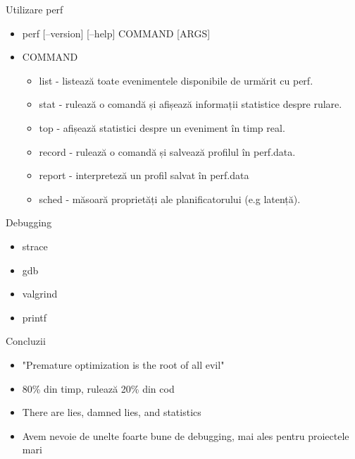 \documentclass{so.cs.pub.ro}
\begin{document}
\begin{frame}{Utilizare perf}
  \begin{itemize}
    \item perf [--version] [--help] COMMAND [ARGS]
    \item COMMAND
    \begin{itemize}
    \item list - listează toate evenimentele disponibile de urmărit cu perf. 
    \item stat - rulează o comandă și afișează informații statistice despre rulare.
    \item top - afișează statistici despre un eveniment în timp real.
    \item record - rulează o comandă și salvează profilul în perf.data.
    \item report - interpreteză un profil salvat în perf.data
    \item sched - măsoară proprietăți ale planificatorului (e.g latență).
    \end{itemize}
  \end{itemize}
\end{frame}

\begin{frame}{Debugging}
  \begin{itemize}
    \item strace
    \item gdb
    \item valgrind
    \item printf
  \end{itemize}
\end{frame}



\begin{frame}{Concluzii}
  \begin{itemize}
    \item "Premature optimization is the root of all evil"
    \item 80\% din timp, rulează 20\% din cod
    \item There are lies, damned lies, and statistics
    \item Avem nevoie de unelte foarte bune de debugging, mai ales pentru
    proiectele mari
  \end{itemize}
\end{frame}


\end{document}
